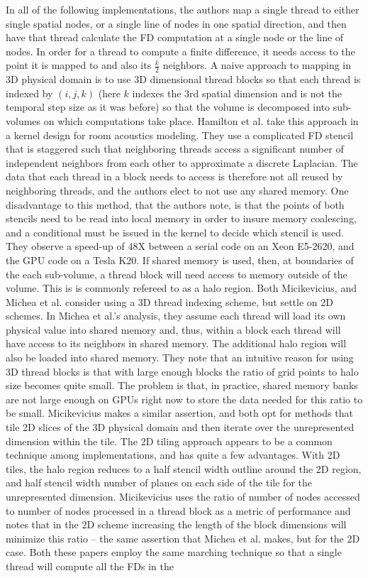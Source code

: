 \documentclass[conference]{IEEEtran}
\begin{document}
In all of the following implementations, the authors map a single thread to either single spatial nodes, or a single line of nodes in one spatial direction, and then have that thread calculate the FD computation at a single node or the line of nodes. In order for a thread to compute a finite difference, it needs access to the point it is mapped to and also its $\frac{k}{2}$ neighbors. A naive approach to mapping in 3D physical domain is to use 3D dimensional thread blocks so that each thread is indexed by $(i,j,k)$ (here $k$ indexes the 3rd spatial dimension and is not the temporal step size as it was before) so that the volume is decomposed into sub-volumes on which computations take place\cite{Michea}. Hamilton et al.\cite{Hamilton} take this approach in a kernel design for room acoustics modeling. They use a complicated FD stencil that is staggered such that neighboring threads access a significant number of independent neighbors from each other to approximate a discrete Laplacian. The data that each thread in a block needs to access is therefore not all reused by neighboring threads, and the authors elect to not use any shared memory. One disadvantage to this method, that the authors note, is that the points of both stencils need to be read into local memory in order to insure memory coalescing, and a conditional must be issued in the kernel to decide which stencil is used. They observe a speed-up of 48X between a serial code on an Xeon E5-2620, and the GPU code on a Tesla K20. If shared memory is used, then, at boundaries of the each sub-volume, a thread block will need access to memory outside of the volume. This is is commonly refereed to as a halo region. Both Micikevicius\cite{Micikevicius}, and Michea et al.\cite{Michea} consider using a 3D thread indexing scheme, but settle on 2D schemes. In Michea et al.'s\cite{Michea} analysis, they assume each thread will load its own physical value into shared memory and, thus, within a block each thread will have access to its neighbors in shared memory. The additional halo region will also be loaded into shared memory. They note that an intuitive reason for using 3D thread blocks is that with large enough blocks the ratio of grid points to halo size becomes quite small. The problem is that, in practice, shared memory banks are not large enough on GPUs right now to store the data needed for this ratio to be small. Micikevicius\cite{Micikevicius} makes a similar assertion, and both opt for methods that tile 2D slices of the 3D physical domain and then iterate over the unrepresented dimension within the tile. The 2D tiling approach appears to be a common technique among implementations, and has quite a few advantages. With 2D tiles, the halo region reduces to a half stencil width outline around the 2D region, and half stencil width number of planes on each side of the tile for the unrepresented dimension. Micikevicius\cite{Micikevicius} uses the ratio of number of nodes accessed to number of nodes processed in a thread block as a metric of performance and notes that in the 2D scheme increasing the length of the block dimensions will minimize this ratio -- the same assertion that Michea et al. makes, but for the 2D case. Both these papers employ the same marching technique so that a single thread will compute all the FDs in the 
\end{document}
